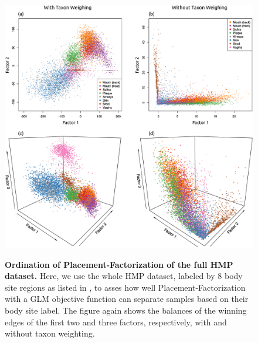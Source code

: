 \begin{figure}[!htbp]
    \centering
     \includegraphics[width=\linewidth]{pdf/hmp_pf_all_ordination.pdf}
    \begin{subfigure}{0pt}
        \label{fig:hmp_pf_all_ordination:sub:2d_with_taxon_weighting}
    \end{subfigure}
    \begin{subfigure}{0pt}
        \label{fig:hmp_pf_all_ordination:sub:2d_without_taxon_weighting}
    \end{subfigure}
    \begin{subfigure}{0pt}
        \label{fig:hmp_pf_all_ordination:sub:3d_with_taxon_weighting}
    \end{subfigure}
    \begin{subfigure}{0pt}
        \label{fig:hmp_pf_all_ordination:sub:3d_without_taxon_weighting}
    \end{subfigure}
    \caption[Ordination of Placement-Factorization of the full \acs{HMP} dataset]{
        \textbf{Ordination of Placement-Factorization of the full \ac{HMP} dataset.}
        Here, we use the whole \ac{HMP} dataset,
        labeled by \num{8} body site regions as listed in ,
        to asses how well Placement-Factorization with a \ac{GLM} objective function
        can separate samples based on their body site label.
        The figure again shows the balances of the winning edges of the first two and three factors, respectively,
        with and without taxon weighting.
    }
    \label{fig:hmp_pf_all_ordination}
\end{figure}

